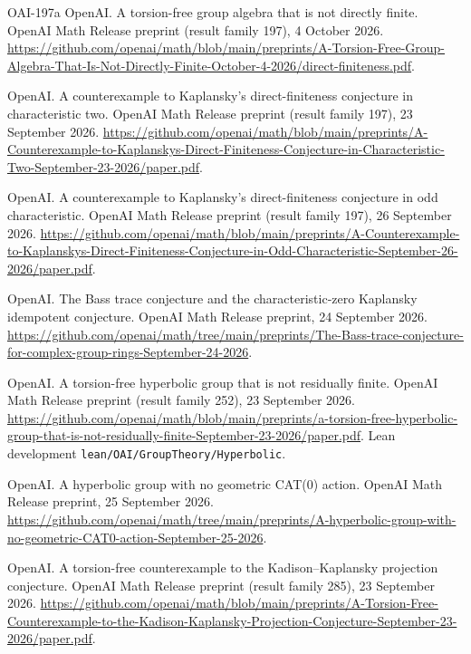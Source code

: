 \documentclass[11pt]{article}
\theoremstyle{definition}
\theoremstyle{plain}
\begin{document}
\begin{thebibliography}{OAI-197a}
OpenAI.
\newblock A torsion-free group algebra that is not directly finite.
\newblock OpenAI Math Release preprint (result family 197), 4 October 2026. \url{https://github.com/openai/math/blob/main/preprints/A-Torsion-Free-Group-Algebra-That-Is-Not-Directly-Finite-October-4-2026/direct-finiteness.pdf}.

OpenAI.
\newblock A counterexample to Kaplansky's direct-finiteness conjecture in characteristic two.
\newblock OpenAI Math Release preprint (result family 197), 23 September 2026. \url{https://github.com/openai/math/blob/main/preprints/A-Counterexample-to-Kaplanskys-Direct-Finiteness-Conjecture-in-Characteristic-Two-September-23-2026/paper.pdf}.

OpenAI.
\newblock A counterexample to Kaplansky's direct-finiteness conjecture in odd characteristic.
\newblock OpenAI Math Release preprint (result family 197), 26 September 2026. \url{https://github.com/openai/math/blob/main/preprints/A-Counterexample-to-Kaplanskys-Direct-Finiteness-Conjecture-in-Odd-Characteristic-September-26-2026/paper.pdf}.

OpenAI.
\newblock The Bass trace conjecture and the characteristic-zero Kaplansky idempotent conjecture.
\newblock OpenAI Math Release preprint, 24 September 2026. \url{https://github.com/openai/math/tree/main/preprints/The-Bass-trace-conjecture-for-complex-group-rings-September-24-2026}.

OpenAI.
\newblock A torsion-free hyperbolic group that is not residually finite.
\newblock OpenAI Math Release preprint (result family 252), 23 September 2026. \url{https://github.com/openai/math/blob/main/preprints/a-torsion-free-hyperbolic-group-that-is-not-residually-finite-September-23-2026/paper.pdf}. Lean development \texttt{lean/OAI/GroupTheory/Hyperbolic}.

OpenAI.
\newblock A hyperbolic group with no geometric CAT(0) action.
\newblock OpenAI Math Release preprint, 25 September 2026. \url{https://github.com/openai/math/tree/main/preprints/A-hyperbolic-group-with-no-geometric-CAT0-action-September-25-2026}.

OpenAI.
\newblock A torsion-free counterexample to the Kadison--Kaplansky projection conjecture.
\newblock OpenAI Math Release preprint (result family 285), 23 September 2026. \url{https://github.com/openai/math/blob/main/preprints/A-Torsion-Free-Counterexample-to-the-Kadison-Kaplansky-Projection-Conjecture-September-23-2026/paper.pdf}.


\end{thebibliography}
\end{document}
